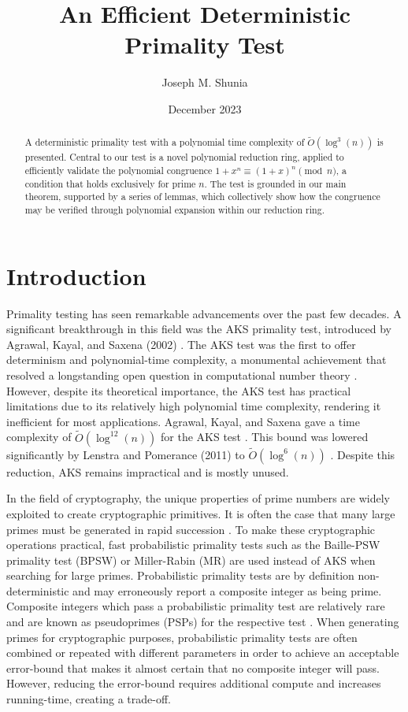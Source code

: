 \documentclass{article}
\title{An Efficient Deterministic Primality Test}
\author{Joseph M. Shunia}
\date{December 2023}
\theoremstyle{plain}
\theoremstyle{definition}
\begin{document}
\maketitle

\begin{abstract}
A deterministic primality test with a polynomial time complexity of $\tilde{O}(\log^3(n))$ is presented. Central to our test is a novel polynomial reduction ring, applied to efficiently validate the polynomial congruence $1 + x^n \equiv (1 + x)^n \pmod{n}$, a condition that holds exclusively for prime $n$. The test is grounded in our main theorem, supported by a series of lemmas, which collectively show how the congruence may be verified through polynomial expansion within our reduction ring.
\end{abstract}

\section{Introduction}

Primality testing has seen remarkable advancements over the past few decades. A significant breakthrough in this field was the AKS primality test, introduced by Agrawal, Kayal, and Saxena (2002) \cite{aks2002}. The AKS test was the first to offer determinism and polynomial-time complexity, a monumental achievement that resolved a longstanding open question in computational number theory \cite{goldreich2008}. However, despite its theoretical importance, the AKS test has practical limitations due to its relatively high polynomial time complexity, rendering it inefficient for most applications. Agrawal, Kayal, and Saxena gave a time complexity of $\tilde{O}(\log^{12}(n))$ for the AKS test \cite{aks2002}. This bound was lowered significantly by Lenstra and Pomerance (2011) to $\tilde{O}(\log^6(n))$ \cite{lenstra2011}. Despite this reduction, AKS remains impractical and is mostly unused.

In the field of cryptography, the unique properties of prime numbers are widely exploited to create cryptographic primitives. It is often the case that many large primes must be generated in rapid succession \cite{lenstra1987}. To make these cryptographic operations practical, fast probabilistic primality tests such as the Baille-PSW primality test (BPSW) \cite{baillie1980} or Miller-Rabin (MR) \cite{rabin1980} \cite{miller1976} are used instead of AKS when searching for large primes. Probabilistic primality tests are by definition non-deterministic and may erroneously report a composite integer as being prime. Composite integers which pass a probabilistic primality test are relatively rare and are known as pseudoprimes (PSPs) for the respective test \cite{wagstaff1983}. When generating primes for cryptographic purposes, probabilistic primality tests are often combined or repeated with different parameters in order to achieve an acceptable error-bound that makes it almost certain that no composite integer will pass. However, reducing the error-bound requires additional compute and increases running-time, creating a trade-off.
\end{document}
